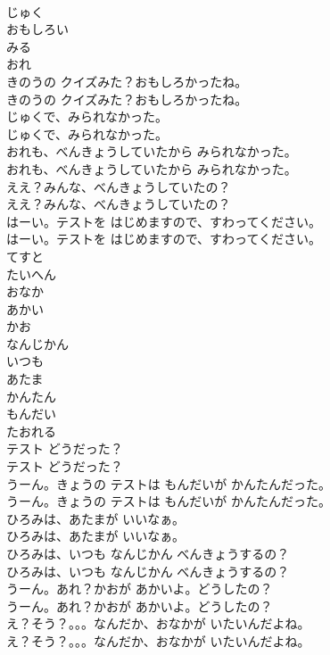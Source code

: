 \documentclass[8pt]{extreport}
\begin{document}
\begin{CJK}{UTF8}{min}
\\	じゅく
\\	おもしろい
\\	みる
\\	おれ
\\	きのうの クイズみた？おもしろかったね。
\\	きのうの クイズみた？おもしろかったね。
\\	じゅくで、みられなかった。
\\	じゅくで、みられなかった。
\\	おれも、べんきょうしていたから みられなかった。
\\	おれも、べんきょうしていたから みられなかった。
\\	ええ？みんな、べんきょうしていたの？
\\	ええ？みんな、べんきょうしていたの？
\\	はーい。テストを はじめますので、すわってください。
\\	はーい。テストを はじめますので、すわってください。
\\	てすと
\\	たいへん
\\	おなか
\\	あかい
\\	かお
\\	なんじかん
\\	いつも
\\	あたま
\\	かんたん
\\	もんだい
\\	たおれる
\\	テスト どうだった？
\\	テスト どうだった？
\\	うーん。きょうの テストは もんだいが かんたんだった。
\\	うーん。きょうの テストは もんだいが かんたんだった。
\\	ひろみは、あたまが いいなぁ。
\\	ひろみは、あたまが いいなぁ。
\\	ひろみは、いつも なんじかん べんきょうするの？
\\	ひろみは、いつも なんじかん べんきょうするの？
\\	うーん。あれ？かおが あかいよ。どうしたの？
\\	うーん。あれ？かおが あかいよ。どうしたの？
\\	え？そう？。。。なんだか、おなかが いたいんだよね。
\\	え？そう？。。。なんだか、おなかが いたいんだよね。

\end{CJK}
\end{document}
